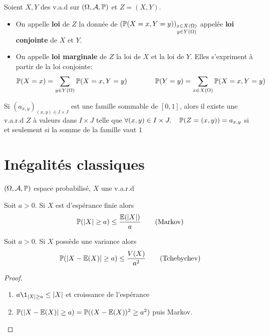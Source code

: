 \begin{dfn}
    Soient $X,Y$ des v.a.d sur $(\Omega, \mathcal  A, \P)$ et $Z=(X,Y)$.  \begin{itemize}
        \item On appelle \textbf{loi} de $Z$ la donnée de  $(\P(X=x,Y=y))_{\substack{x\in X(\Omega)\\y\in Y(\Omega)}}$ appelée \textbf{loi conjointe} de $X$ et $Y$.
        \item On appelle \textbf{loi marginale} de $Z$ la loi de $X$ et la loi de $Y$. Elles s'expriment à partir de la loi conjointe: \[
                \P(X=x)=\sum_{y \in  Y(\Omega)}\P(X=x,Y=y) \qquad \qquad \P(Y=y)=\sum_{x \in  X(\Omega)}\P(X=x,Y=y)
        \] 
    \end{itemize}
\end{dfn}
\begin{rem}
    Si $(a_{x,y})_{(x,y)\in  I\times J}$ est une famille sommable de $[0,1]$, alors il existe une v.a.r.d $Z$ à valeurs dans $I\times J$ telle que $ \forall (x,y)\in I\times J,\quad  \P(Z=(x,y))=a_{x,y}$ si et seulement si la somme de la famille vaut $1$
\end{rem}

\section{Inégalités classiques}

\begin{thm}
    \Hyp $(\Omega, \mathcal  A, \P)$ espace probabilisé, $X$ une v.a.r.d
     \begin{concenum}
     \item Soit $a>0$. Si $X$ est d'espérance finie alors \[
             \P(|X|\geq a)\leq \frac{\E(|X|)}{a}\tag{Markov}
     \] 
 \item Soit $a>0$. Si  $X$ possède une variance alors  \[
         \P(|X-\E(X)|\geq a)\leq \frac{V(X)}{a^2}\tag{Tchebychev}
 \] 
    \end{concenum}
\end{thm}

\begin{proof}
~ \begin{enumerate}
    \item $a\1_{|X|\geq a}\leq |X|$ et croissance de l'espérance
    \item  $ \P(|X-\E(X)|\geq a)=\P((X-\E(X))^2\geq a^2)$ puis Markov.
\end{enumerate}
\end{proof}

